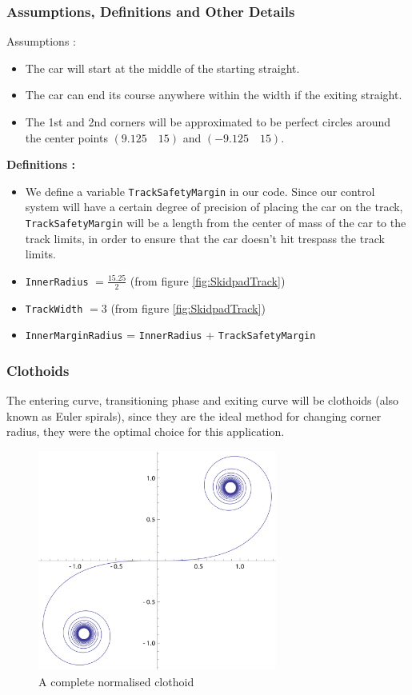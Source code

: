 \documentclass[a4paper, 11pt]{article}
\begin{document}
\subsubsection{Assumptions, Definitions and Other Details}
Assumptions :
\begin{itemize}
	\item The car will start at the middle of the starting straight.
	\item The car can end its course anywhere within the width if the exiting straight.
	\item The 1st and 2nd corners will be approximated to be perfect circles around the center points $\left(9.125\quad 15 \right)$ and $\left(-9.125\quad 15 \right)$.
\end{itemize}
\textbf{Definitions :}
\begin{itemize}
	\item We define a variable \texttt{TrackSafetyMargin} in our code. Since our control system will have a certain degree of precision of placing the car on the track, \texttt{TrackSafetyMargin} will be a length from the center of mass of the car to the track limits, in order to ensure that the car doesn't hit trespass the track limits.
	\item \texttt{InnerRadius} $=\frac{15.25}{2}$ (from figure \ref{fig:SkidpadTrack})
	\item \texttt{TrackWidth} $=3$ (from figure \ref{fig:SkidpadTrack})
	\item \texttt{InnerMarginRadius} = \texttt{InnerRadius} + \texttt{TrackSafetyMargin}
\end{itemize}



\subsubsection{Clothoids}

The entering curve, transitioning phase and exiting curve will be clothoids (also known as Euler spirals), since they are the ideal method for changing corner radius, they were the optimal choice for this application.

\begin{figure}[H]
	\centering
	\includegraphics[width = 0.7\textwidth]{Figures/ClothoidExample.eps}
	\caption{A complete normalised clothoid}
	\label{fig:ClothoidExample}
\end{figure}
\end{document}
